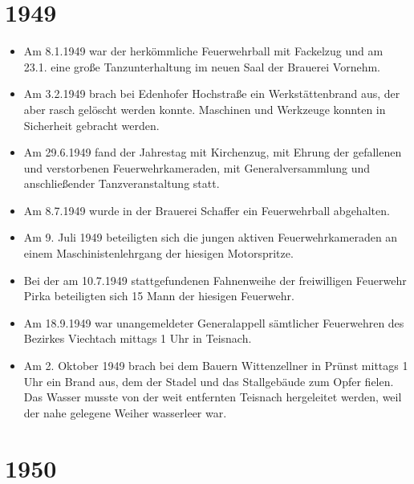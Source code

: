 \documentclass[12pt,a4paper]{book}
\begin{document}
\section*{1949}

\begin{itemize}
\item Am 8.1.1949 war der herkömmliche Feuerwehrball mit Fackelzug und
am 23.1. eine große Tanzunterhaltung im neuen Saal der Brauerei Vornehm.

\item Am 3.2.1949 brach bei Edenhofer Hochstraße ein Werkstättenbrand
aus, der aber rasch gelöscht werden konnte. Maschinen und Werkzeuge
konnten in Sicherheit gebracht werden.

\item Am 29.6.1949 fand der Jahrestag mit Kirchenzug, mit Ehrung der
gefallenen und verstorbenen Feuerwehrkameraden, mit Generalversammlung
und anschließender Tanzveranstaltung statt.

\item Am 8.7.1949 wurde in der Brauerei Schaffer ein Feuerwehrball
abgehalten.

\item Am 9. Juli 1949 beteiligten sich die jungen aktiven
Feuerwehrkameraden an einem Maschinistenlehrgang der hiesigen
Motorspritze.

\item Bei der am 10.7.1949 stattgefundenen Fahnenweihe der freiwilligen
Feuerwehr Pirka beteiligten sich 15 Mann der hiesigen Feuerwehr.

\item Am 18.9.1949 war unangemeldeter Generalappell sämtlicher
Feuerwehren des Bezirkes Viechtach mittags 1 Uhr in Teisnach.

\item Am 2. Oktober 1949 brach bei dem Bauern Wittenzellner in Prünst
mittags 1 Uhr ein Brand aus, dem der Stadel und das Stallgebäude zum
Opfer fielen. Das Wasser musste von der weit entfernten Teisnach
hergeleitet werden, weil der nahe gelegene Weiher wasserleer war.
\end{itemize}

\section*{1950}
\end{document}

